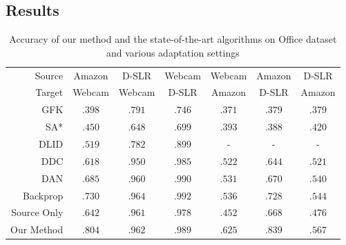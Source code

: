 \subsection{Results}
\begin{table}[t]
\caption{Accuracy of our method and the state-of-the-art algorithms on Office dataset and various adaptation settings}
\label{tab:res}
\begin{sc}
\begin{center}
\begin{small}
\begin{tabular}{@{}rcccccc@{}} \toprule 
 Source & Amazon & D-SLR & Webcam & Webcam &Amazon & D-SLR \\
 Target & Webcam & Webcam & D-SLR & Amazon & D-SLR & Amazon \\
 \midrule
GFK \cite{gong2012} & $.398$ & $.791$ & $.746 $ & $.371$ & $.379$ & .379   \\
SA* \cite{fernando13} & $.450$ & $.648$ & $.699$ & $.393$ & $.388$ & $.420$ \\
DLID \cite{chopra13} & $.519$ & $.782$ & $.899$ & -&- &- \\
DDC \cite{tzeng14} & $.618$ & $.950$ & $.985$ & $.522$ & $.644$& $.521$\\
DAN \cite{wang15} & $.685$ & $.960$ & $.990$ & $.531$ & $.670$ & $.540$ \\
Backprop \cite{ganin15} & $.730$ &$\mathbf{.964}$ & $\mathbf{.992}$ & $.536$ & $.728$ & $.544$\\
\midrule
Source Only & $.642$ & $.961$ & $.978$ & $.452$ & $.668$ & $.476$ \\
Our Method & $\mathbf{.804}$ &.962 & $.989$ & $\mathbf{.625}$ & $\mathbf{.839}$ & $\mathbf{.567}$ \\
 \bottomrule
\end{tabular}
\end{small}
\end{center}
\end{sc}
\end{table}



\begin{table}[t]
\caption{Accuracy of our method and the digit classification task.}
\label{tab:res}
\begin{sc}
\begin{small}
\end{small}
\end{sc}
\end{table}

